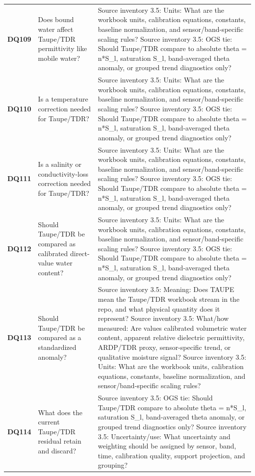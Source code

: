 \begin{longtable}{@{}L{0.09\textwidth} L{0.31\textwidth} L{0.52\textwidth}@{}}
\addlinespace[0.18em]
\textbf{DQ109} & Does bound water affect Taupe/TDR permittivity like mobile water? & Source inventory 3.5: Units: What are the workbook units, calibration equations, constants, baseline normalization, and sensor/band-specific scaling rules? Source inventory 3.5: OGS tie: Should Taupe/TDR compare to absolute theta = n*S\_l, saturation S\_l, band-averaged theta anomaly, or grouped trend diagnostics only?\\
\addlinespace[0.18em]
\textbf{DQ110} & Is a temperature correction needed for Taupe/TDR? & Source inventory 3.5: Units: What are the workbook units, calibration equations, constants, baseline normalization, and sensor/band-specific scaling rules? Source inventory 3.5: OGS tie: Should Taupe/TDR compare to absolute theta = n*S\_l, saturation S\_l, band-averaged theta anomaly, or grouped trend diagnostics only?\\
\addlinespace[0.18em]
\textbf{DQ111} & Is a salinity or conductivity-loss correction needed for Taupe/TDR? & Source inventory 3.5: Units: What are the workbook units, calibration equations, constants, baseline normalization, and sensor/band-specific scaling rules? Source inventory 3.5: OGS tie: Should Taupe/TDR compare to absolute theta = n*S\_l, saturation S\_l, band-averaged theta anomaly, or grouped trend diagnostics only?\\
\addlinespace[0.18em]
\textbf{DQ112} & Should Taupe/TDR be compared as calibrated direct-value water content? & Source inventory 3.5: Units: What are the workbook units, calibration equations, constants, baseline normalization, and sensor/band-specific scaling rules? Source inventory 3.5: OGS tie: Should Taupe/TDR compare to absolute theta = n*S\_l, saturation S\_l, band-averaged theta anomaly, or grouped trend diagnostics only?\\
\addlinespace[0.18em]
\textbf{DQ113} & Should Taupe/TDR be compared as a standardized anomaly? & Source inventory 3.5: Meaning: Does TAUPE mean the Taupe/TDR workbook stream in the repo, and what physical quantity does it represent? Source inventory 3.5: What/how measured: Are values calibrated volumetric water content, apparent relative dielectric permittivity, ARDP/TDR proxy, sensor-specific trend, or qualitative moisture signal? Source inventory 3.5: Units: What are the workbook units, calibration equations, constants, baseline normalization, and sensor/band-specific scaling rules?\\
\addlinespace[0.18em]
\textbf{DQ114} & What does the current Taupe/TDR residual retain and discard? & Source inventory 3.5: OGS tie: Should Taupe/TDR compare to absolute theta = n*S\_l, saturation S\_l, band-averaged theta anomaly, or grouped trend diagnostics only? Source inventory 3.5: Uncertainty/use: What uncertainty and weighting should be assigned by sensor, band, time, calibration quality, support projection, and grouping?\\

\end{longtable}
